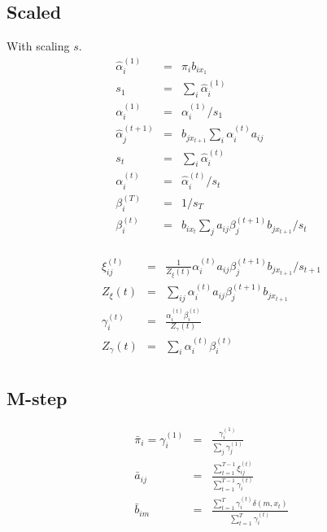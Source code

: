 \documentclass{article}
\begin{document}
\subsection{Scaled}
With scaling $s$.
\begin{eqnarray*}
\hat\alpha_i^{(1)} &=& \pi_i b_{ix_1} \\
s_1 &=& \sum_i \hat\alpha_i^{(1)} \\
\alpha_i^{(1)} &=& \alpha_i^{(1)} / s_1 \\
\hat\alpha_j^{(t+1)} &=& b_{jx_{t+1}} \sum_i \alpha_i^{(t)} a_{ij} \\
s_t &=& \sum_i \hat\alpha_i^{(t)} \\
\alpha_i^{(t)} &=& \hat\alpha_i^{(t)} / s_t \\
\beta_i^{(T)} &=& 1 / s_T \\
\beta_i^{(t)} &=& b_{ix_t} \sum_j a_{ij} \beta_j^{(t+1)} b_{jx_{t+1}}
/ s_t \\
\end{eqnarray*}

\begin{eqnarray*}
\xi_{ij}^{(t)}
&=& \frac {1}{Z_\xi(t)} \alpha_i^{(t)} a_{ij} \beta_j^{(t+1)}
b_{jx_{t+1}} /s_{t+1} \\
Z_\xi(t) &=& \sum_{ij} \alpha_i^{(t)} a_{ij} \beta_j^{(t+1)} b_{jx_{t+1}} \\
\gamma_i^{(t)}
&=& \frac { \alpha_i^{(t)} \beta_i^{(t)} } { Z_\gamma(t) } \\
Z_\gamma(t) &=& \sum_i \alpha_i^{(t)} \beta_i^{(t)} \\
\end{eqnarray*}

\subsection{M-step}
\begin{eqnarray*}
\bar\pi_i = \gamma_i^{(1)}
&=& \frac{\gamma_i^{(1)}}{\sum_j \gamma_j^{(1)}} \\
\bar a_{ij}
&=& \frac
{ \sum_{t=1}^{T-1} \xi_{ij}^{(t)} }
{ \sum_{t=1}^{T-1} \gamma_i^{(t)} } \\
\bar b_{im}
&=& \frac
{ \sum_{t=1}^{T} \gamma_i^{(t)} \delta(m, x_t) }
{ \sum_{t=1}^{T} \gamma_i^{(t)}  } \\
\end{eqnarray*}




\end{document}
